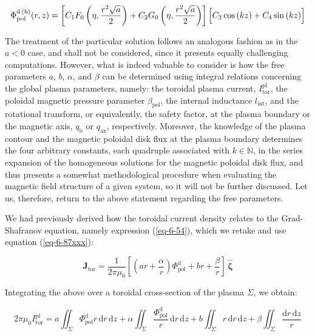 \begin{equation}
    \Phi_\text{pol}^\text{d\,(h)}(r,z)=\left[C_1F_0\left(\eta,\frac{r^2\sqrt{a}}{2}\right)+C_2G_0\left(\eta,\frac{r^2\sqrt{a}}{2}\right)\right]\Big[C_3\cos{(kz)}+C_4\sin{(kz)}\Big]
\end{equation}

The treatment of the particular solution follows an analogous fashion as in the $a<0$ case, and shall not be considered, since it presents equally challenging computations. However, what is indeed valuable to consider is how the free parameters $a$, $b$, $\alpha$, and $\beta$ can be determined using integral relations concerning the global plasma parameters, namely: the toroidal plasma current, $I_\text{tor}^\text{pl}$, the poloidal magnetic pressure parameter $\beta_\text{pol}$, the internal inductance $l_\text{int}$, and the rotational transform, or equivalently, the safety factor, at the plasma boundary or the magnetic axis, $q_\text{b}$ or $q_\text{ax}$, respectively. Moreover, the knowledge of the plasma contour and the magnetic poloidal disk flux at the plasma boundary determines the four arbitrary constants, each quadruple associated with $k\in\mathbb{N}$, in the series expansion of the homogeneous solutions for the magnetic poloidal disk flux, and thus presents a somewhat methodological procedure when evaluating the magnetic field structure of a given system, so it will not be further discussed. Let us, therefore, return to the above statement regarding the free parameters.

\quad We had previously derived how the toroidal current density relates to the Grad-Shafranov equation, namely expression (\ref{eq-6-54}), which we retake and use equation (\ref{eq-6-87xxx}):

\begin{equation}
    \mathbf{J}_\text{tor}=\frac{1}{2\pi\mu_0}\left[\left(ar+\frac{\alpha}{r}\right)\Phi_\text{pol}^\mathrm{d}+br+\frac{\beta}{r}\right]\,\mathbf{\hat{\zeta}}
\end{equation}

Integrating the above over a toroidal cross-section of the plasma $\Sigma$, we obtain:

\begin{equation}
    2\pi\mu_0I_\text{tor}^\text{pl}=a\iint_{\Sigma}\Phi_\text{pol}^\mathrm{d}r\,\mathrm{d}r\,\mathrm{d}z+\alpha\iint_\Sigma\frac{\Phi_\text{pol}^\mathrm{d}}{r}\,\mathrm{d}r\,\mathrm{d}z+b\iint_\Sigma r\,\mathrm{d}r\,\mathrm{d}z+\beta\iint_\Sigma\frac{\mathrm{d}r\,\mathrm{d}z}{r}
\end{equation}

